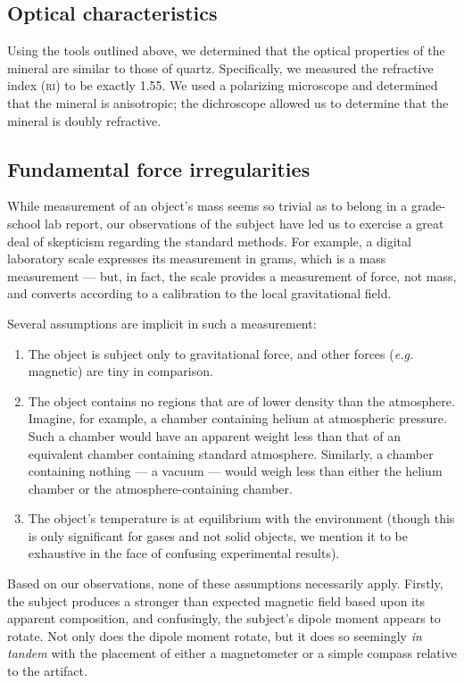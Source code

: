 \documentclass[10pt]{article}
\begin{document}
\subsection{Optical characteristics}
Using the tools outlined above, we determined that the optical properties of the mineral are similar to those of quartz.
Specifically, we measured the refractive index (\textsc{ri}) to be exactly 1.55.
We used a polarizing microscope and determined that the mineral is anisotropic; the dichroscope allowed us to determine that the mineral is doubly refractive.

\subsection{Fundamental force irregularities}
While measurement of an object's mass seems so trivial as to belong in a grade-school lab report, our observations of the subject have led us to exercise a great deal of skepticism regarding the standard methods.
For example, a digital laboratory scale expresses its measurement in grams, which is a mass measurement --- but, in fact, the scale provides a measurement of force, not mass, and converts according to a calibration to the local gravitational field.

Several assumptions are implicit in such a measurement:
\begin{enumerate}
\item The object is subject only to gravitational force, and other forces (\textit{e.g.} magnetic) are tiny in comparison.
\item The object contains no regions that are of lower density than the atmosphere. Imagine, for example, a chamber containing helium at atmospheric pressure. Such a chamber would have an apparent weight less than that of an equivalent chamber containing standard atmosphere. Similarly, a chamber containing nothing --- a vacuum --- would weigh less than either the helium chamber or the atmosphere-containing chamber.
\item The object's temperature is at equilibrium with the environment (though this is only significant for gases and not solid objects, we mention it to be exhaustive in the face of confusing experimental results).
\end{enumerate}

Based on our observations, none of these assumptions necessarily apply.
Firstly, the subject produces a stronger than expected magnetic field based upon its apparent composition, and confusingly, the subject's dipole moment appears to rotate.
Not only does the dipole moment rotate, but it does so seemingly \textit{in tandem} with the placement of either a magnetometer or a simple compass relative to the artifact.
\end{document}
